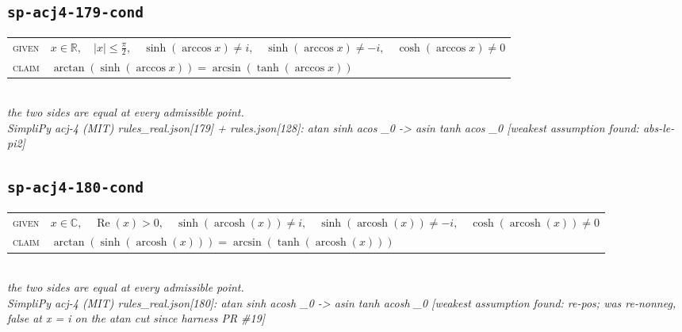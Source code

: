 \documentclass[11pt]{article}
\begin{document}
\subsection*{\texttt{sp-acj4-179-cond}}
\begin{tabular}{@{}l@{\quad}l@{}}
\textsc{given} & $x \in \mathbb{R},\quad \left|x\right| \le \frac{\pi}{2},\quad \sinh\left(\arccos x\right) \neq i,\quad \sinh\left(\arccos x\right) \neq -i,\quad \cosh\left(\arccos x\right) \neq 0$ \\[4pt]
\textsc{claim} & $\displaystyle \arctan\left(\sinh\left(\arccos x\right)\right) = \arcsin\left(\tanh\left(\arccos x\right)\right)$ \\
\end{tabular}\\[2pt]
{\small\emph{the two sides are equal at every admissible point.}}\\
\emph{SimpliPy acj-4 (MIT) rules\_real.json[179] + rules.json[128]: atan sinh acos \_0  ->  asin tanh acos \_0  [weakest assumption found: abs-le-pi2]}\\

\subsection*{\texttt{sp-acj4-180-cond}}
\begin{tabular}{@{}l@{\quad}l@{}}
\textsc{given} & $x \in \mathbb{C},\quad \operatorname{Re}\left(x\right) > 0,\quad \sinh\left(\operatorname{arcosh}\left(x\right)\right) \neq i,\quad \sinh\left(\operatorname{arcosh}\left(x\right)\right) \neq -i,\quad \cosh\left(\operatorname{arcosh}\left(x\right)\right) \neq 0$ \\[4pt]
\textsc{claim} & $\displaystyle \arctan\left(\sinh\left(\operatorname{arcosh}\left(x\right)\right)\right) = \arcsin\left(\tanh\left(\operatorname{arcosh}\left(x\right)\right)\right)$ \\
\end{tabular}\\[2pt]
{\small\emph{the two sides are equal at every admissible point.}}\\
\emph{SimpliPy acj-4 (MIT) rules\_real.json[180]: atan sinh acosh \_0  ->  asin tanh acosh \_0  [weakest assumption found: re-pos; was re-nonneg, false at x = i on the atan cut since harness PR \#19]}\\
\end{document}
